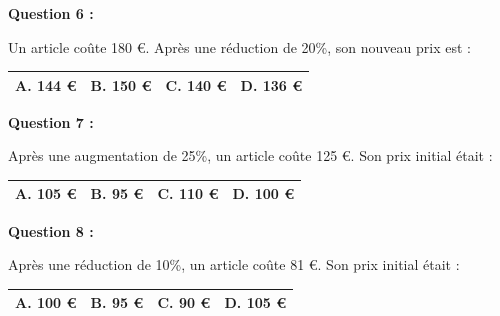 \documentclass[12pt,a4paper]{article}
\begin{document}
\vspace{0.7cm}

\textbf{Question 6 :}
\vspace{5pt}

Un article coûte 180 €. Après une réduction de 20\%, son nouveau prix est :
\vspace{0.3cm}

\renewcommand{\arraystretch}{3}
\begin{tabular}{|m{3.4cm}|m{3.4cm}|m{3.4cm}|m{3.4cm}|}
\hline
\centering \vspace{-0.3cm} \textbf{A.} 144 € & 
\centering \vspace{-0.3cm} \textbf{B.} 150 € & 
\centering \vspace{-0.3cm} \textbf{C.} 140 € & 
\centering \vspace{-0.3cm} \textbf{D.} 136 € \tabularnewline
\hline
\end{tabular}

\vspace{0.7cm}

\textbf{Question 7 :}
\vspace{5pt}

Après une augmentation de 25\%, un article coûte 125 €. Son prix initial était :
\vspace{0.3cm}

\renewcommand{\arraystretch}{3}
\begin{tabular}{|m{3.4cm}|m{3.4cm}|m{3.4cm}|m{3.4cm}|}
\hline
\centering \vspace{-0.3cm} \textbf{A.} 105 € & 
\centering \vspace{-0.3cm} \textbf{B.} 95 € & 
\centering \vspace{-0.3cm} \textbf{C.} 110 € & 
\centering \vspace{-0.3cm} \textbf{D.} 100 € \tabularnewline
\hline
\end{tabular}

\vspace{0.7cm}

\textbf{Question 8 :}
\vspace{5pt}

Après une réduction de 10\%, un article coûte 81 €. Son prix initial était :
\vspace{0.3cm}

\renewcommand{\arraystretch}{3}
\begin{tabular}{|m{3.4cm}|m{3.4cm}|m{3.4cm}|m{3.4cm}|}
\hline
\centering \vspace{-0.3cm} \textbf{A.} 100 € & 
\centering \vspace{-0.3cm} \textbf{B.} 95 € & 
\centering \vspace{-0.3cm} \textbf{C.} 90 € & 
\centering \vspace{-0.3cm} \textbf{D.} 105 € \tabularnewline
\hline
\end{tabular}
\end{document}
